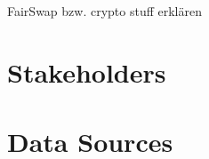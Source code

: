 FairSwap bzw. crypto stuff erklären

\section{Stakeholders}
\label{section:stakeholders}

\section{Data Sources}
\label{section:datasource}



